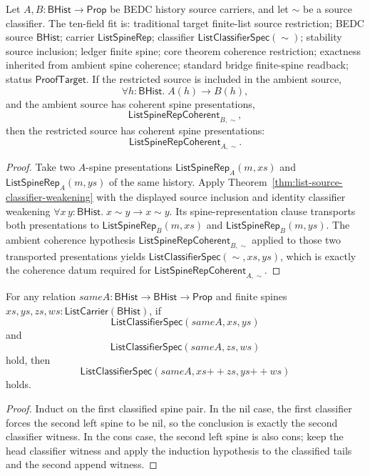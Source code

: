 \begin{theorem}
\label{thm:list-spine-coherence-source-restriction}
Let $A,B:\mathsf{BHist}\to\mathsf{Prop}$ be BEDC history source carriers, and
let $\sim$ be a source classifier. The ten-field fit is: traditional target
finite-list source restriction; BEDC source $\mathsf{BHist}$; carrier
$\mathsf{ListSpineRep}$; classifier $\mathsf{ListClassifierSpec}(\sim)$;
stability source inclusion; ledger finite spine; core theorem coherence
restriction; exactness inherited from ambient spine coherence; standard bridge
finite-spine readback; status $\mathsf{ProofTarget}$. If the restricted source
is included in the ambient source,
$$
\forall h:\mathsf{BHist}.\; A(h)\to B(h),
$$
and the ambient source has coherent spine presentations,
$$
\mathsf{ListSpineRepCoherent}_{B,\sim},
$$
then the restricted source has coherent spine presentations:
$$
\mathsf{ListSpineRepCoherent}_{A,\sim}.
$$
\end{theorem}
\begin{proof}
Take two $A$-spine presentations $\mathsf{ListSpineRep}_A(m,xs)$ and
$\mathsf{ListSpineRep}_A(m,ys)$ of the same history. Apply
Theorem~\ref{thm:list-source-classifier-weakening} with the displayed source
inclusion and identity classifier weakening
$\forall x\,y:\mathsf{BHist}.\;x\sim y\to x\sim y$. Its spine-representation
clause transports both presentations to $\mathsf{ListSpineRep}_B(m,xs)$ and
$\mathsf{ListSpineRep}_B(m,ys)$. The ambient coherence hypothesis
$\mathsf{ListSpineRepCoherent}_{B,\sim}$ applied to those two transported
presentations yields $\mathsf{ListClassifierSpec}(\sim,xs,ys)$, which is exactly
the coherence datum required for $\mathsf{ListSpineRepCoherent}_{A,\sim}$.
\end{proof}

\begin{theorem}
\label{thm:list-classifier-BHist-append}
For any relation $sameA:\mathsf{BHist}\to\mathsf{BHist}\to\mathsf{Prop}$ and
finite spines $xs,ys,zs,ws:\mathsf{ListCarrier}(\mathsf{BHist})$, if
$$
\mathsf{ListClassifierSpec}(sameA,xs,ys)
$$
and
$$
\mathsf{ListClassifierSpec}(sameA,zs,ws)
$$
hold, then
$$
\mathsf{ListClassifierSpec}(sameA,xs{++}zs,ys{++}ws)
$$
holds.
\end{theorem}
\begin{proof}
Induct on the first classified spine pair. In the nil case, the first
classifier forces the second left spine to be nil, so the conclusion is exactly
the second classifier witness. In the cons case, the second left spine is also
cons; keep the head classifier witness and apply the induction hypothesis to
the classified tails and the second append witness.
\end{proof}

